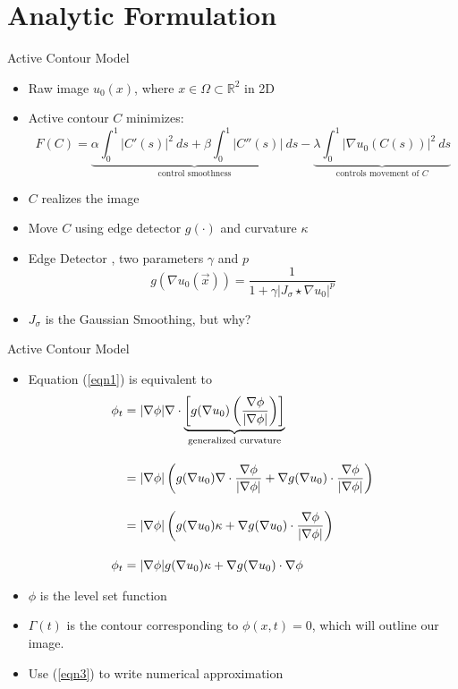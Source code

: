 \documentclass[xcolor=dvipsnames]{beamer}
\begin{document}
\section{Analytic Formulation}
\begin{frame}{Active Contour Model}
\begin{itemize}
\item Raw image $u_0(x)$, where $x\in\Omega\subset\mathbb{R}^2$ in 2D
    \item Active contour $C$ minimizes:
    \begin{equation}\label{eqn1}
F(C)=\underbrace{\alpha\int_0^1|C'(s)|^2\ ds + \beta\int_0^1|C''(s)|\ ds}_{\textrm{control smoothness}} - \underbrace{\lambda\int_0^1|\nabla u_0(C(s))|^2\ ds}_{\textrm{controls movement of $C$}}
\end{equation}
\item $C$ realizes the image
\item Move $C$ using edge detector $g(\cdot)$ and curvature $\kappa$
\item Edge Detector \cite{osher2006level}, two parameters $\gamma$ and $p$
\begin{equation}\label{eqn2}
    g(\nabla u_0(\Vec{x}))=\frac{1}{1+\gamma|J_\sigma\star \nabla u_0|^p}
\end{equation}
\item $J_\sigma$ is the Gaussian Smoothing, but why?
\end{itemize}
\end{frame}
\begin{frame}{Active Contour Model}
    \begin{itemize}
        \item Equation (\ref{eqn1}) is equivalent to \cite{osher2006level,osti_478429} \begin{align}
\phi_t &= |\nabla\phi|\nabla\cdot\underbrace{\left[g(\nabla u_0) \left(\frac{\nabla\phi}{|\nabla\phi|}\right)\right]}_{\textrm{generalized curvature}}\notag \\[10pt]
&=|\nabla\phi|\left(g(\nabla u_0)\nabla\cdot\frac{\nabla\phi}{|\nabla\phi|}+\nabla g(\nabla u_0)\cdot\frac{\nabla\phi}{|\nabla\phi|} \right)\label{eqn3}\\[10pt]
&=|\nabla\phi|\left(g(\nabla u_0)\kappa+\nabla g(\nabla u_0)\cdot\frac{\nabla\phi}{|\nabla\phi|} \right)\notag \\[10pt]
\phi_t&=|\nabla\phi|g(\nabla u_0)\kappa+\nabla g(\nabla u_0)\cdot\nabla\phi\label{eqn4}
\end{align}
\item $\phi$ is the level set function
\item $\Gamma(t)$ is the contour corresponding to $\phi(x,t)=0$, which will outline our image.
\item Use (\ref{eqn3}) to write numerical approximation
    \end{itemize}
\end{frame}
\end{document}
